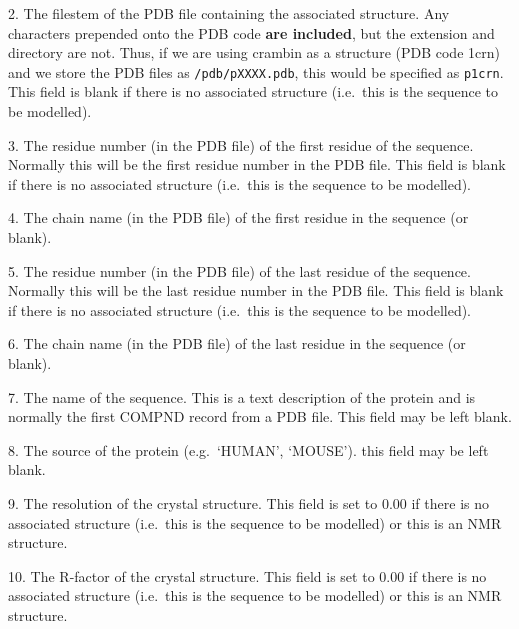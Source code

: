 2. The filestem of the PDB file containing the associated
structure. Any characters prepended onto the PDB code {\bfseries are included},
but the extension and directory are not. Thus, if we are using crambin
as a structure (PDB code 1crn) and we store the PDB files as
{\tt /pdb/pXXXX.pdb}, this would be specified as {\tt p1crn}. This field is
blank if there is no associated structure (i.e.\ this is the sequence
to be modelled).

3. The residue number (in the PDB file) of the first residue of the
sequence. Normally this will be the first residue number in the PDB
file. This field is blank if there is no associated structure
(i.e.\ this is the sequence to be modelled).

4. The chain name (in the PDB file) of the first residue in the
sequence (or blank).

5. The residue number (in the PDB file) of the last residue of the
sequence. Normally this will be the last residue number in the PDB
file. This field is blank if there is no associated structure
(i.e.\ this is the sequence to be modelled).

6. The chain name (in the PDB file) of the last residue in the
sequence (or blank).

7. The name of the sequence. This is a text description of the protein
and is normally the first COMPND record from a PDB file. This field
may be left blank.

8. The source of the protein (e.g.\ `HUMAN', `MOUSE'). this field may
be left blank.

9. The resolution of the crystal structure. This field is set to 0.00
if there is no associated structure (i.e.\ this is the sequence to be
modelled) or this is an NMR structure.

10. The R-factor of the crystal structure. This field is set to 0.00
if there is no associated structure (i.e.\ this is the sequence to be
modelled) or this is an NMR structure.

